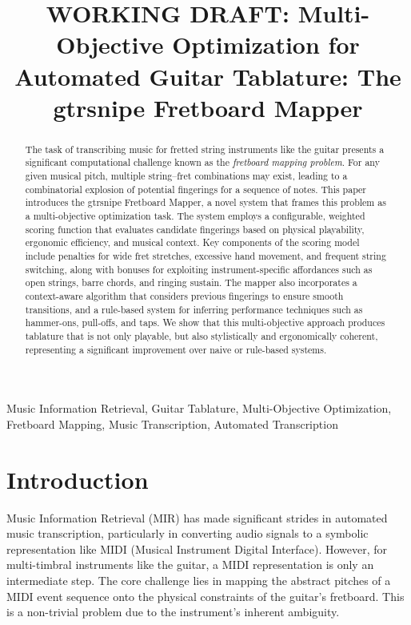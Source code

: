\documentclass[conference]{IEEEtran}
\title{WORKING DRAFT: Multi-Objective Optimization for Automated Guitar Tablature: The gtrsnipe Fretboard Mapper}
\author{
\IEEEauthorblockN{Scott VanRavenswaay}
\IEEEauthorblockA{Email: scottvr@gmail.com}
}
\begin{document}
\maketitle

\begin{abstract}
The task of transcribing music for fretted string instruments like the guitar presents a significant computational challenge known as the \emph{fretboard mapping problem}. For any given musical pitch, multiple string–fret combinations may exist, leading to a combinatorial explosion of potential fingerings for a sequence of notes. This paper introduces the gtrsnipe Fretboard Mapper, a novel system that frames this problem as a multi-objective optimization task. The system employs a configurable, weighted scoring function that evaluates candidate fingerings based on physical playability, ergonomic efficiency, and musical context. Key components of the scoring model include penalties for wide fret stretches, excessive hand movement, and frequent string switching, along with bonuses for exploiting instrument-specific affordances such as open strings, barre chords, and ringing sustain. The mapper also incorporates a context-aware algorithm that considers previous fingerings to ensure smooth transitions, and a rule-based system for inferring performance techniques such as hammer-ons, pull-offs, and taps. We show that this multi-objective approach produces tablature that is not only playable, but also stylistically and ergonomically coherent, representing a significant improvement over naive or rule-based systems.

\end{abstract}

\begin{IEEEkeywords}
Music Information Retrieval, Guitar Tablature, Multi-Objective Optimization, Fretboard Mapping, Music Transcription, Automated Transcription
\end{IEEEkeywords}

\section{Introduction}

Music Information Retrieval (MIR) has made significant strides in automated music transcription, particularly in converting audio signals to a symbolic representation like MIDI (Musical Instrument Digital Interface). However, for multi-timbral instruments like the guitar, a MIDI representation is only an intermediate step. The core challenge lies in mapping the abstract pitches of a MIDI event sequence onto the physical constraints of the guitar's fretboard. This is a non-trivial problem due to the instrument's inherent ambiguity.
\end{document}
